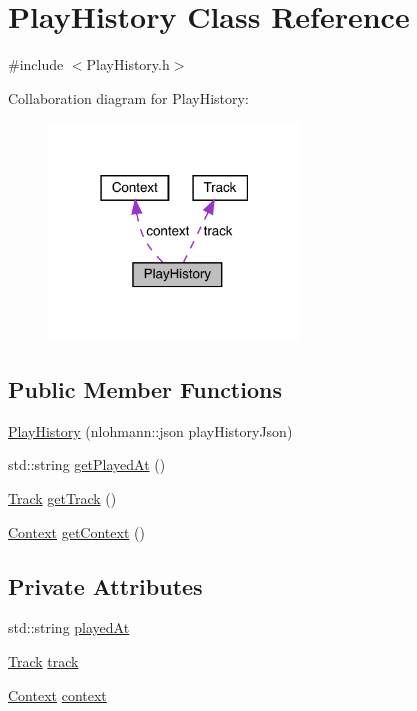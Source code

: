 \hypertarget{class_play_history}{}\section{Play\+History Class Reference}
\label{class_play_history}


{\ttfamily \#include $<$Play\+History.\+h$>$}



Collaboration diagram for Play\+History\+:
\nopagebreak
\begin{figure}[H]
\begin{center}
\leavevmode
\includegraphics[width=190pt]{class_play_history__coll__graph}
\end{center}
\end{figure}
\subsection*{Public Member Functions}
\begin{DoxyCompactItemize}
\item 
\mbox{\hyperlink{class_play_history_a6c737045b91392aacc82f3a217cce4d7}{Play\+History}} (nlohmann\+::json play\+History\+Json)
\item 
std\+::string \mbox{\hyperlink{class_play_history_a51e1bcd62d2f80aa7ebda7b2402a172f}{get\+Played\+At}} ()
\item 
\mbox{\hyperlink{class_track}{Track}} \mbox{\hyperlink{class_play_history_a6fbb2b15f1bf248aec7896850d0514d7}{get\+Track}} ()
\item 
\mbox{\hyperlink{class_context}{Context}} \mbox{\hyperlink{class_play_history_ac110c181cf56e2d3f5b6e5041f557371}{get\+Context}} ()
\end{DoxyCompactItemize}
\subsection*{Private Attributes}
\begin{DoxyCompactItemize}
\item 
std\+::string \mbox{\hyperlink{class_play_history_a4ba2ba8a6851df5c1cae76b9ca8bc672}{played\+At}}
\item 
\mbox{\hyperlink{class_track}{Track}} \mbox{\hyperlink{class_play_history_a4e28e27155a1138c083bf58303f1c959}{track}}
\item 
\mbox{\hyperlink{class_context}{Context}} \mbox{\hyperlink{class_play_history_a47d8a86c14434d7d41c285c4bb2e08cd}{context}}
\end{DoxyCompactItemize}


